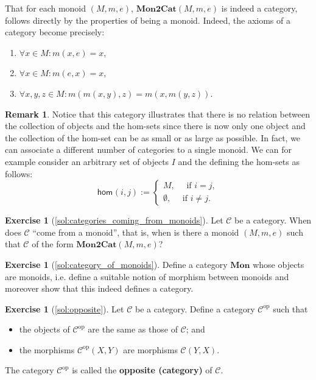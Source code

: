 \documentclass[a4paper,11pt, oneside,titlepage=false]{scrbook}
\theoremstyle{plain}
\theoremstyle{definition}
\newtheorem{rem}[thm]{Remark}
\newtheorem{exer}[thm]{Exercise}
\newcommand{\cfont}[1]{\ensuremath{\mathsf{#1}}}
\newcommand{\Cat}[1]{\mathcal{#1}}
\newcommand{\CC}{\Cat{C}}
\newcommand{\Catb}[1]{\mathbf{#1}}
\newcommand{\MONtoCAT}{\Catb{Mon2Cat}}
\newcommand{\MON}{\Catb{Mon}}
\newcommand{\Hom}[3][]{\cfont{hom}_{#1}(#2,#3)}
\newcommand{\CHom}[3]{{#1}(#2,#3)}
\newcommand{\op}[1]{\ensuremath{{#1}^\text{op}}}
\begin{document}
That for each monoid $(M,m,e)$, $\MONtoCAT(M,m,e)$ is indeed a category, follows directly by the properties of being a monoid. Indeed, the axioms of a category become precisely:
\begin{enumerate}
\item $\forall x\in M: m(x,e)=x$,
\item $\forall x\in M: m(e,x)=x$,
\item $\forall x,y,z\in M: m(m(x,y),z) = m(x,m(y,z))$.
\end{enumerate}

\begin{rem} Notice that this category illustrates that there is no relation between the collection of objects and the hom-sets since there is now only one object and the collection of the hom-set can be as small or as large as possible.
In fact, we can associate a different number of categories to a single monoid. We can for example consider an arbitrary set of objects $I$ and the defining the hom-sets as follows:
\[
\Hom{i}{j} := 
\begin{cases}
M ,\quad \text{ if } i=j,\\
\emptyset, \quad \text{ if } i\not=j.
\end{cases}
\]
\end{rem}

\begin{exer}[\cref{sol:categories_coming_from_monoids}]\label{exer:categories_coming_from_monoids}
  Let $\CC$ be a category. When does $\CC$ ``come from a monoid'', that is, when is there a monoid $(M,m,e)$ such that $\CC$ of the form $\MONtoCAT(M,m,e)$?
\end{exer}

\begin{exer}[\cref{sol:category_of_monoids}]\label{exer:category_of_monoids}
  Define a category $\MON$ whose objects are monoids, i.e. define a suitable notion of morphism between monoids and moreover show that this indeed defines a category.
\end{exer}

\begin{exer}[\cref{sol:opposite}]\label{exer:opposite}
  Let $\CC$ be a category. Define a category $\op\CC$ such that
  \begin{itemize}
  \item the objects of $\op\CC$ are the same as those of $\CC$; and
  \item the morphisms $\CHom {\op\CC} X Y$ are morphisms $\CHom \CC Y X$.
  \end{itemize}
  The category $\op\CC$ is called the \textbf{opposite (category)} of $\CC$.
\end{exer}
\end{document}
